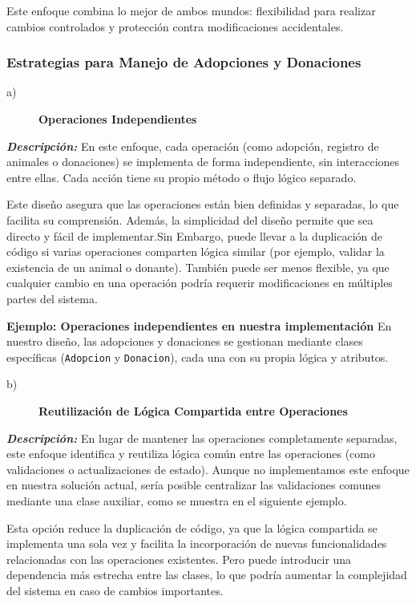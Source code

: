 Este enfoque combina lo mejor de ambos mundos: flexibilidad para realizar cambios controlados 
y protección contra modificaciones accidentales.



\subsubsection{Estrategias para Manejo de Adopciones y Donaciones}

\begin{description}
    \item[a)] \textbf{Operaciones Independientes}
\end{description}

\textit{\textbf{Descripción:}}  
En este enfoque, cada operación (como adopción, registro de animales o donaciones) se 
implementa de forma independiente, sin interacciones entre ellas. Cada acción tiene su 
propio método o flujo lógico separado.
\vspace{0.15cm}

    Este diseño asegura que las operaciones están bien definidas y separadas, lo que 
    facilita su comprensión. Además, la simplicidad del diseño permite que sea directo y 
    fácil de implementar.Sin Embargo, puede llevar a la duplicación de código si varias operaciones comparten lógica similar 
    (por ejemplo, validar la existencia de un animal o donante). También puede ser menos 
    flexible, ya que cualquier cambio en una operación podría requerir modificaciones en 
    múltiples partes del sistema.\par
    \vspace{0.15cm}

\textbf{Ejemplo: Operaciones independientes en nuestra implementación}  
En nuestro diseño, las adopciones y donaciones se gestionan mediante clases específicas 
(\texttt{Adopcion} y \texttt{Donacion}), cada una con su propia lógica y atributos.

\begin{description}
    \item[b)] \textbf{Reutilización de Lógica Compartida entre Operaciones}
\end{description}

\textit{\textbf{Descripción:}}  
En lugar de mantener las operaciones completamente separadas, este enfoque identifica y 
reutiliza lógica común entre las operaciones (como validaciones o actualizaciones de estado). 
Aunque no implementamos este enfoque en nuestra solución actual, sería posible centralizar las 
validaciones comunes mediante una clase auxiliar, como se muestra en el siguiente ejemplo.\par
\vspace{0.15cm}
Esta opción reduce la duplicación de código, ya que la lógica compartida se implementa una sola vez
y facilita la incorporación de nuevas funcionalidades relacionadas con las operaciones existentes. Pero 
puede introducir una dependencia más estrecha entre las clases, lo que podría aumentar 
la complejidad del sistema en caso de cambios importantes.

